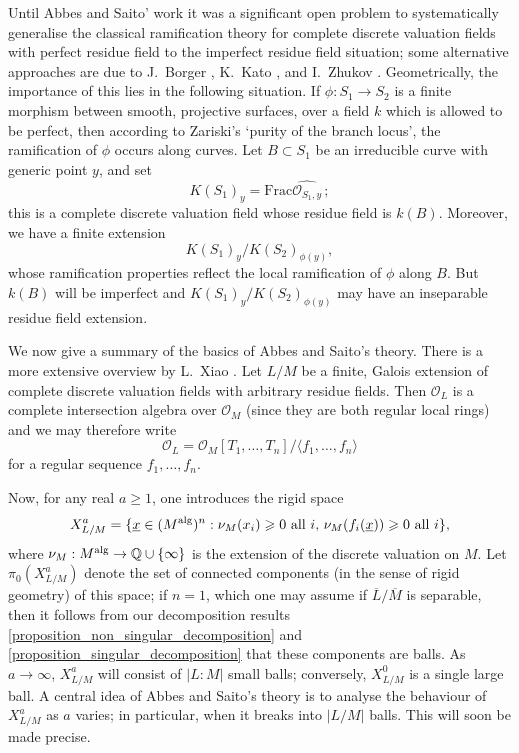 \documentclass{lmsMODIFIED}
\newcommand{\bb}[1]{\mathbb{#1}}
\newcommand{\roi}{\mathcal{O}}
\newcommand{\res}[1]{\overline{#1}}
\newcommand{\sub}[1]{{\mbox{\scriptsize {#1}}}}
\newcommand{\ul}[1]{{\underline{#1}}}
\begin{document}
Until Abbes and Saito' work it was a significant open problem to systematically generalise the classical ramification theory for complete discrete valuation fields with perfect residue field to the imperfect residue field situation; some alternative approaches are due to J.~Borger \cite{Borger2004} \cite{Borger2004a}, K.~Kato \cite{Kato1989} \cite{Kato1994}, and I.~Zhukov \cite{Zhukov2000} \cite{Zhukov2003}. Geometrically, the importance of this lies in the following situation. If $\phi:S_1\to S_2$ is a finite morphism between smooth, projective surfaces, over a field $k$ which is allowed to be perfect, then according to Zariski's `purity of the branch locus', the ramification of $\phi$ occurs along curves. Let $B\subset S_1$ be an irreducible curve with generic point $y$, and set \[K(S_1)_y=\mbox{Frac}\widehat{\roi_{S_1,y}}\,;\] this is a complete discrete valuation field whose residue field is $k(B)$. Moreover, we have a finite extension \[K(S_1)_y/K(S_2)_{\phi(y)},\] whose ramification properties reflect the local ramification of $\phi$ along $B$. But $k(B)$ will be imperfect and $K(S_1)_y/K(S_2)_{\phi(y)}$ may have an inseparable residue field extension.

We now give a summary of the basics of Abbes and Saito's theory. There is a more extensive overview by L.~Xiao \cite{Xiao2007}. Let $L/M$ be a finite, Galois extension of complete discrete valuation fields with arbitrary residue fields. Then $\roi_L$ is a complete intersection algebra over $\roi_M$ (since they are both regular local rings) and we may therefore write \[\roi_L=\roi_M[T_1,\dots,T_n]/\langle f_1,\dots,f_n\rangle\] for a regular sequence $f_1,\dots,f_n$.

Now, for any real $a\ge 1$, one introduces the rigid space \[X_{L/M}^a=\{\ul{x}\in (M^\sub{alg})^n:\nu_M(x_i)\ge0\mbox{ all }i,\,\nu_M(f_i(\ul{x}))\ge0\mbox{ all }i\},\] where $\nu_M:M^\sub{alg}\to\bb{Q}\cup\{\infty\}$ is the extension of the discrete valuation on $M$. Let $\pi_0(X_{L/M}^a)$ denote the set of connected components (in the sense of rigid geometry) of this space; if $n=1$, which one may assume if $\res{L}/\res{M}$ is separable, then it follows from our decomposition results \ref{proposition_non_singular_decomposition} and \ref{proposition_singular_decomposition} that these components are balls. As $a\to\infty$, $X_{L/M}^a$ will consist of $|L:M|$ small balls; conversely, $X_{L/M}^0$ is a single large ball. A central idea of Abbes and Saito's theory is to analyse the behaviour of $X_{L/M}^a$ as $a$ varies; in particular, when it breaks into $|L/M|$ balls. This will soon be made precise.
\end{document}
